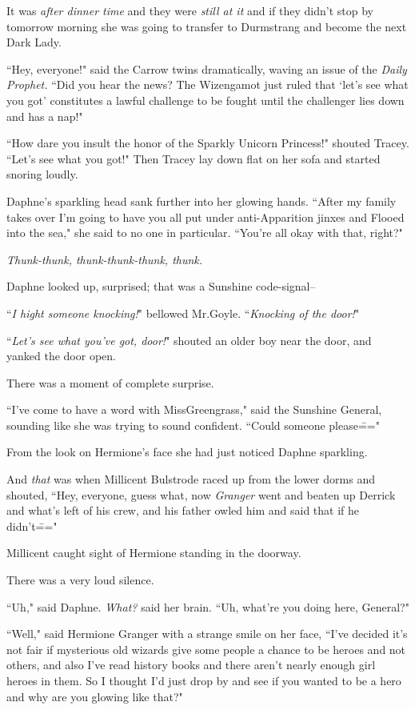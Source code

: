It was \emph{after dinner time} and they were \emph{still at it} and if they didn't stop by tomorrow morning she was going to transfer to Durmstrang and become the next Dark Lady.

``Hey, everyone!" said the Carrow twins dramatically, waving an issue of the \emph{Daily Prophet.} ``Did you hear the news? The Wizengamot just ruled that `let's see what you got' constitutes a lawful challenge to be fought until the challenger lies down and has a nap!"

``How dare you insult the honor of the Sparkly Unicorn Princess!" shouted Tracey. ``Let's see what you got!" Then Tracey lay down flat on her sofa and started snoring loudly.

Daphne's sparkling head sank further into her glowing hands. ``After my family takes over I'm going to have you all put under anti-Apparition jinxes and Flooed into the sea," she said to no one in particular. ``You're all okay with that, right?"

\emph{Thunk-thunk, thunk-thunk-thunk, thunk.}

Daphne looked up, surprised; that was a Sunshine code-signal\---

``\emph{I hight someone knocking!}" bellowed Mr.\?Goyle. ``\emph{Knocking of the door!}"

``\emph{Let's see what you've got, door!}" shouted an older boy near the door, and yanked the door open.

There was a moment of complete surprise.

``I've come to have a word with Miss\?Greengrass," said the Sunshine General, sounding like she was trying to sound confident. ``Could someone please\==="

From the look on Hermione's face she had just noticed Daphne sparkling.

And \emph{that} was when Millicent Bulstrode raced up from the lower dorms and shouted, ``Hey, everyone, guess what, now \emph{Granger} went and beaten up Derrick and what's left of his crew, and his father owled him and said that if he didn't\==="

Millicent caught sight of Hermione standing in the doorway.

There was a very loud silence.

``Uh," said Daphne. \emph{What?} said her brain. ``Uh, what're you doing here, General?"

``Well," said Hermione Granger with a strange smile on her face, ``I've decided it's not fair if mysterious old wizards give some people a chance to be heroes and not others, and also I've read history books and there aren't nearly enough girl heroes in them. So I thought I'd just drop by and see if you wanted to be a hero and why are you glowing like that?"

